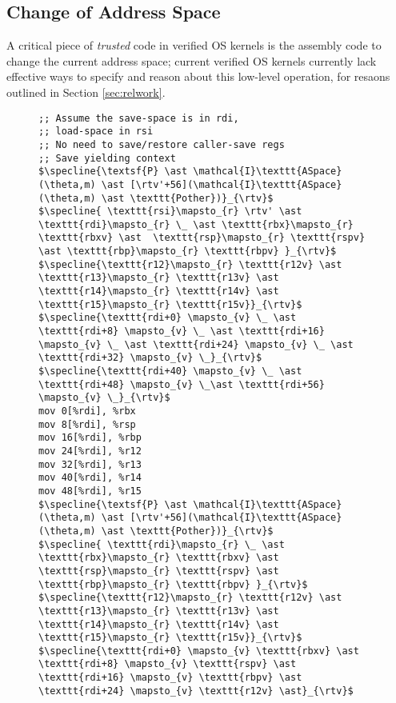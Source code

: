 \subsection{Change of Address Space}
A critical piece of \emph{trusted} code in verified OS kernels is the assembly code to change the current address space; current verified OS kernels currently lack effective ways to specify and reason about this low-level operation, for resaons outlined in Section \ref{sec:relwork}.
\begin{figure}\footnotesize
\begin{lstlisting}
;; Assume the save-space is in rdi,
;; load-space in rsi
;; No need to save/restore caller-save regs
;; Save yielding context
$\specline{\textsf{P} \ast \mathcal{I}\texttt{ASpace}(\theta,m) \ast [\rtv'+56](\mathcal{I}\texttt{ASpace}(\theta,m) \ast \texttt{Pother})}_{\rtv}$
$\specline{ \texttt{rsi}\mapsto_{r} \rtv' \ast \texttt{rdi}\mapsto_{r} \_ \ast \texttt{rbx}\mapsto_{r} \texttt{rbxv} \ast  \texttt{rsp}\mapsto_{r} \texttt{rspv} \ast \texttt{rbp}\mapsto_{r} \texttt{rbpv} }_{\rtv}$
$\specline{\texttt{r12}\mapsto_{r} \texttt{r12v} \ast \texttt{r13}\mapsto_{r} \texttt{r13v} \ast \texttt{r14}\mapsto_{r} \texttt{r14v} \ast \texttt{r15}\mapsto_{r} \texttt{r15v}}_{\rtv}$
$\specline{\texttt{rdi+0} \mapsto_{v} \_ \ast \texttt{rdi+8} \mapsto_{v} \_ \ast \texttt{rdi+16} \mapsto_{v} \_ \ast \texttt{rdi+24} \mapsto_{v} \_ \ast \texttt{rdi+32} \mapsto_{v} \_}_{\rtv}$
$\specline{\texttt{rdi+40} \mapsto_{v} \_ \ast \texttt{rdi+48} \mapsto_{v} \_\ast \texttt{rdi+56} \mapsto_{v} \_}_{\rtv}$
mov 0[%rdi], %rbx
mov 8[%rdi], %rsp
mov 16[%rdi], %rbp
mov 24[%rdi], %r12
mov 32[%rdi], %r13
mov 40[%rdi], %r14
mov 48[%rdi], %r15
$\specline{\textsf{P} \ast \mathcal{I}\texttt{ASpace}(\theta,m) \ast [\rtv'+56](\mathcal{I}\texttt{ASpace}(\theta,m) \ast \texttt{Pother})}_{\rtv}$
$\specline{ \texttt{rdi}\mapsto_{r} \_ \ast \texttt{rbx}\mapsto_{r} \texttt{rbxv} \ast  \texttt{rsp}\mapsto_{r} \texttt{rspv} \ast \texttt{rbp}\mapsto_{r} \texttt{rbpv} }_{\rtv}$
$\specline{\texttt{r12}\mapsto_{r} \texttt{r12v} \ast \texttt{r13}\mapsto_{r} \texttt{r13v} \ast \texttt{r14}\mapsto_{r} \texttt{r14v} \ast \texttt{r15}\mapsto_{r} \texttt{r15v}}_{\rtv}$
$\specline{\texttt{rdi+0} \mapsto_{v} \texttt{rbxv} \ast \texttt{rdi+8} \mapsto_{v} \texttt{rspv} \ast \texttt{rdi+16} \mapsto_{v} \texttt{rbpv} \ast \texttt{rdi+24} \mapsto_{v} \texttt{r12v} \ast}_{\rtv}$

\end{lstlisting}
\end{figure}

